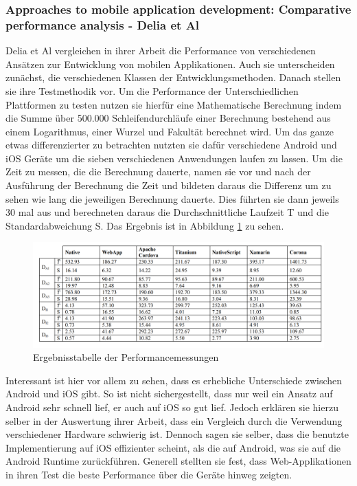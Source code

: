 \subsubsection{Approaches to mobile application development: Comparative performance analysis - Delia et Al}
Delia et Al vergleichen in ihrer Arbeit die Performance von verschiedenen Ansätzen zur Entwicklung von mobilen Applikationen. Auch sie unterscheiden zunächst, die verschiedenen Klassen der Entwicklungsmethoden. Danach stellen sie ihre Testmethodik vor. Um die Performance der Unterschiedlichen Plattformen zu testen nutzen sie hierfür eine Mathematische Berechnung indem die Summe über 500.000 Schleifendurchläufe einer Berechnung bestehend aus einem Logarithmus, einer Wurzel und Fakultät berechnet wird. Um das ganze etwas differenzierter zu betrachten nutzten sie dafür verschiedene Android und iOS Geräte um die sieben verschiedenen Anwendungen laufen zu lassen. Um die Zeit zu messen, die die Berechnung dauerte, namen sie vor und nach der Ausführung der Berechnung die Zeit und bildeten daraus die Differenz um zu sehen wie lang die jeweiligen Berechnung dauerte. Dies führten sie dann jeweils 30 mal aus und berechneten daraus die Durchschnittliche Laufzeit T und die Standardabweichung S. Das Ergebnis ist in Abbildung \ref{fig:result_table_IEEE_related_work} zu sehen.\cite{IEEE_development_classes}

\begin{figure}[ht]
  \centering
  \includegraphics[width=\textwidth,keepaspectratio]{images/IEEE_Delia_Al.png}
  \caption{Ergebnisstabelle der Performancemessungen \cite{IEEE_development_classes}}
  \label{fig:result_table_IEEE_related_work}
\end{figure}

Interessant ist hier vor allem zu sehen, dass es erhebliche Unterschiede zwischen Android und iOS gibt. So ist nicht sichergestellt, dass nur weil ein Ansatz auf Android sehr schnell lief, er auch auf iOS so gut lief. Jedoch erklären sie hierzu selber in der Auswertung ihrer Arbeit, dass ein Vergleich durch die Verwendung verschiedener Hardware schwierig ist.\cite{IEEE_development_classes} Dennoch sagen sie selber, dass die benutzte Implementierung auf iOS effizienter scheint, als die auf Android, was sie auf die Android Runtime zurückführen. Generell stellten sie fest, dass Web-Applikationen in ihren Test die beste Performance über die Geräte hinweg zeigten.\cite{IEEE_development_classes}


